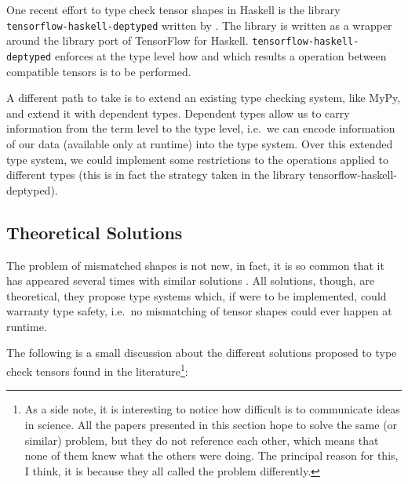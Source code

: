 One recent effort to type check tensor shapes in Haskell is the library
\texttt{tensorflow-haskell-deptyped} written by
\textcite{elkin_haskell_2018}. The library is written as a wrapper
around the library port of TensorFlow for Haskell.
\texttt{tensorflow-haskell-deptyped} enforces at the type level how and
which results a operation between compatible tensors is to be performed.

A different path to take is to extend an existing type checking system,
like MyPy, and extend it with dependent types. Dependent types allow us
to carry information from the term level to the type level, i.e.~we can
encode information of our data (available only at runtime) into the type
system. Over this extended type system, we could implement some
restrictions to the operations applied to different types (this is in
fact the strategy taken in the library tensorflow-haskell-deptyped).

\subsection{Theoretical Solutions}\label{theoretical-solutions}

The problem of mismatched shapes is not new, in fact, it is so common
that it has appeared several times with similar solutions
\autocites{arnold_specifying_2010}{griffioen_type_2015}{rink_modeling_2018}{slepak_array-oriented_2014}{trojahner_dependently_2009}.
All solutions, though, are theoretical, they propose type systems which,
if were to be implemented, could warranty type safety, i.e.~no
mismatching of tensor shapes could ever happen at runtime.

The following is a small discussion about the different solutions
proposed to type check tensors found in the literature\footnote{As a
  side note, it is interesting to notice how difficult is to communicate
  ideas in science. All the papers presented in this section hope to
  solve the same (or similar) problem, but they do not reference each
  other, which means that none of them knew what the others were doing.
  The principal reason for this, I think, it is because they all called
  the problem differently.}:

